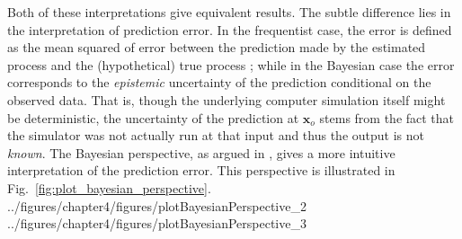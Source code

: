 Both of these interpretations give equivalent results.
The subtle difference lies in the interpretation of prediction error.
In the frequentist case, the error is defined as the mean squared of error between the prediction made by the estimated process and the (hypothetical) true process \cite{Isaaks1989};
while in the Bayesian case the error corresponds to the \emph{epistemic} uncertainty of the prediction conditional on the observed data.
That is, though the underlying computer simulation itself might be deterministic, 
the uncertainty of the prediction at $\mathbf{x}_o$ stems from the fact that the simulator was not actually run at that input and thus the output is not \emph{known}. 
The Bayesian perspective, as argued in \cite{Currin1991,Santner2003,OHagan2006}, gives a more intuitive interpretation of the prediction error.
This perspective is illustrated in Fig.~\ref{fig:plot_bayesian_perspective}.
{../figures/chapter4/figures/plotBayesianPerspective_2}
{../figures/chapter4/figures/plotBayesianPerspective_3}
